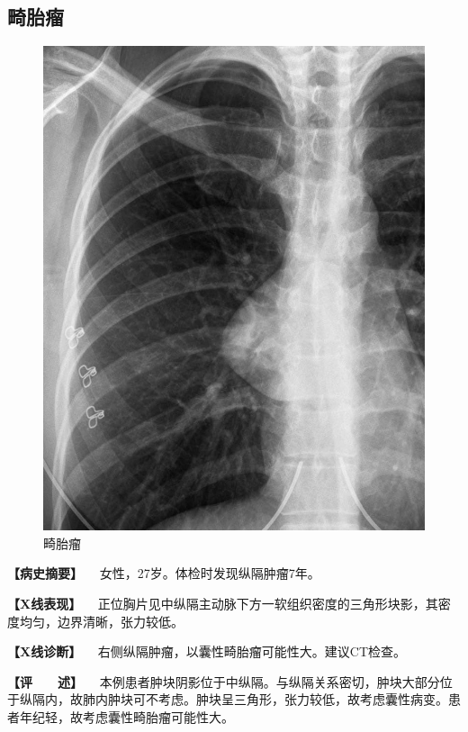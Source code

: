\subsection{畸胎瘤}

\begin{figure}[!htbp]
 \centering
 \includegraphics{./images/Image00196.jpg}
 \captionsetup{justification=centering}
 \caption{畸胎瘤}
 \label{fig3-12-3}
  \end{figure} 

\textbf{【病史摘要】} 　女性，27岁。体检时发现纵隔肿瘤7年。

\textbf{【X线表现】}
　正位胸片见中纵隔主动脉下方一软组织密度的三角形块影，其密度均匀，边界清晰，张力较低。

\textbf{【X线诊断】} 　右侧纵隔肿瘤，以囊性畸胎瘤可能性大。建议CT检查。

\textbf{【评　　述】}
　本例患者肿块阴影位于中纵隔。与纵隔关系密切，肿块大部分位于纵隔内，故肺内肿块可不考虑。肿块呈三角形，张力较低，故考虑囊性病变。患者年纪轻，故考虑囊性畸胎瘤可能性大。

